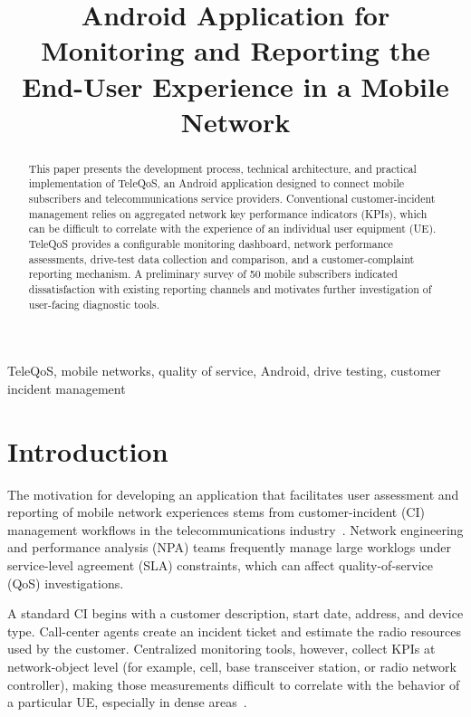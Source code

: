 \documentclass[conference]{IEEEtran}
\begin{document}
\title{Android Application for Monitoring and Reporting the End-User Experience in a Mobile Network}

\author{}

\maketitle

\begin{abstract}
This paper presents the development process, technical architecture, and practical implementation of TeleQoS, an Android application designed to connect mobile subscribers and telecommunications service providers. Conventional customer-incident management relies on aggregated network key performance indicators (KPIs), which can be difficult to correlate with the experience of an individual user equipment (UE). TeleQoS provides a configurable monitoring dashboard, network performance assessments, drive-test data collection and comparison, and a customer-complaint reporting mechanism. A preliminary survey of 50 mobile subscribers indicated dissatisfaction with existing reporting channels and motivates further investigation of user-facing diagnostic tools.
\end{abstract}

\begin{IEEEkeywords}
TeleQoS, mobile networks, quality of service, Android, drive testing, customer incident management
\end{IEEEkeywords}

\section{Introduction}
The motivation for developing an application that facilitates user assessment and reporting of mobile network experiences stems from customer-incident (CI) management workflows in the telecommunications industry~\cite{consumerComplaints}. Network engineering and performance analysis (NPA) teams frequently manage large worklogs under service-level agreement (SLA) constraints, which can affect quality-of-service (QoS) investigations.

A standard CI begins with a customer description, start date, address, and device type. Call-center agents create an incident ticket and estimate the radio resources used by the customer. Centralized monitoring tools, however, collect KPIs at network-object level (for example, cell, base transceiver station, or radio network controller), making those measurements difficult to correlate with the behavior of a particular UE, especially in dense areas~\cite{consumerComplaints}.
\end{document}
